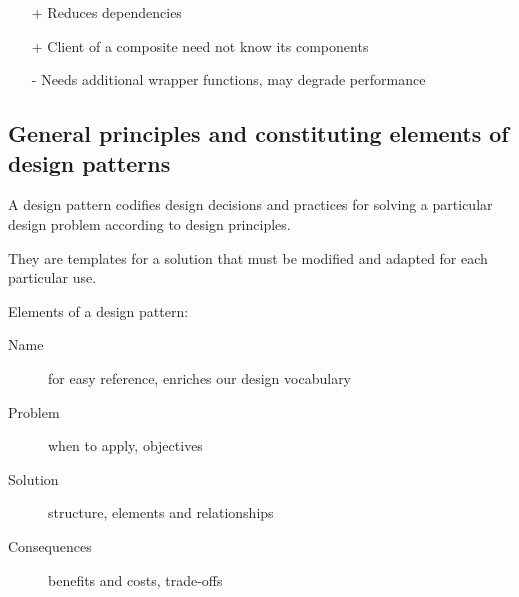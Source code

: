 \begin{itemize}
    \item[+] Reduces dependencies
    \item[+] Client of a composite need not know its components
    \item[-] Needs additional wrapper functions, may degrade performance
\end{itemize}

\subsection{General principles and constituting elements of design patterns}

A design pattern codifies design decisions and practices for solving a particular design
problem according to design principles. \newline

They are templates for a solution that must be modified and adapted for each particular use. \newline

Elements of a design pattern:

\begin{description}
    \item[Name] for easy reference, enriches our design vocabulary
    \item[Problem] when to apply, objectives
    \item[Solution] structure, elements and relationships
    \item[Consequences] benefits and costs, trade-offs
\end{description}
